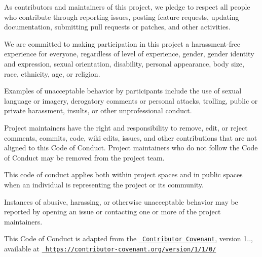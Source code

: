 As contributors and maintainers of this project, we pledge to respect all people who contribute through reporting issues, posting feature requests, updating documentation, submitting pull requests or patches, and other activities.

We are committed to making participation in this project a harassment-\/free experience for everyone, regardless of level of experience, gender, gender identity and expression, sexual orientation, disability, personal appearance, body size, race, ethnicity, age, or religion.

Examples of unacceptable behavior by participants include the use of sexual language or imagery, derogatory comments or personal attacks, trolling, public or private harassment, insults, or other unprofessional conduct.

Project maintainers have the right and responsibility to remove, edit, or reject comments, commits, code, wiki edits, issues, and other contributions that are not aligned to this Code of Conduct. Project maintainers who do not follow the Code of Conduct may be removed from the project team.

This code of conduct applies both within project spaces and in public spaces when an individual is representing the project or its community.

Instances of abusive, harassing, or otherwise unacceptable behavior may be reported by opening an issue or contacting one or more of the project maintainers.

This Code of Conduct is adapted from the \href{https://contributor-covenant.org/}{\texttt{ Contributor Covenant}}, version 1.., available at \href{https://contributor-covenant.org/version/1/1/0/}{\texttt{ https\+://contributor-\/covenant.\+org/version/1/1/0/}} 